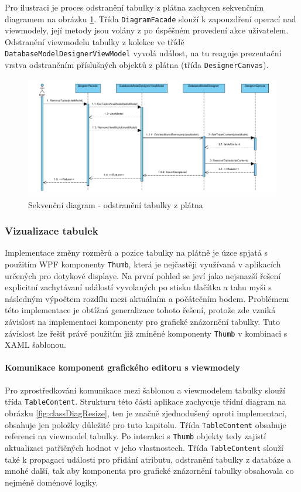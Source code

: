 \documentclass[czech,bachelor,public,dept460,male,oneside]{diploma}
\begin{document}
		Pro ilustraci je proces odstranění tabulky z plátna zachycen sekvenčním diagramem na obrázku \ref{fig:sequenceRemoveTable}. Třída \texttt{DiagramFacade} slouží k zapouzdření operací nad viewmodely, její metody jsou volány z po úspěšném provedení akce uživatelem. Odstranění viewmodelu tabulky z kolekce ve třídě \texttt{DatabaseModelDesignerViewModel} vyvolá událost, na tu reaguje prezentační vrstva odstraněním příslušných objektů z plátna (třída \texttt{DesignerCanvas}).
		
		\begin{figure}[H]
			\centering
			\includegraphics[width=1\textwidth]{Figures/SequenceRemoveTable}
			\caption{Sekvenční diagram - odstranění tabulky z plátna}
			\label{fig:sequenceRemoveTable}
		\end{figure}
		
		\subsubsection{Vizualizace  tabulek}
		Implementace změny rozměrů a pozice tabulky na plátně je úzce spjatá s použitím WPF komponenty \texttt{Thumb}, která je nejčastěji využívaná v aplikacích určených pro dotykové displaye. Na první pohled se jeví jako nejsnazší řešení explicitní zachytávaní událostí vyvolaných po stisku tlačítka a tahu myši s následným výpočtem rozdílu mezi aktuálním a počátečním bodem. Problémem této implementace je obtížná generalizace tohoto řešení, protože zde vzniká závislost na implementaci komponenty pro grafické znázornění tabulky. Tuto závislost lze řešit právě použitím již zmíněné komponenty \texttt{Thumb} v kombinaci s XAML šablonou.
		
		\paragraph{Komunikace komponent grafického editoru s viewmodely}
		Pro zprostředkování komunikace mezi šablonou a viewmodelem tabulky slouží třída \texttt{TableContent}. Strukturu této části aplikace zachycuje třídní diagram na obrázku \ref{fig:classDiagResize}, ten je značně zjednodušený oproti implementaci, obsahuje jen položky důležité pro tuto kapitolu. Třída \texttt{TableContent} obsahuje referenci na viewmodel tabulky. Po interakci s \texttt{Thumb} objekty tedy zajistí aktualizaci patřičných hodnot v jeho vlastnostech. Třída \texttt{TableContent} slouží také k propagaci události pro přidání atributu, odstranění tabulky z databáze a mnohé další, tak aby komponenta pro grafické znázornění tabulky obsahovala co nejméně doménové logiky. 
		
\end{document}
